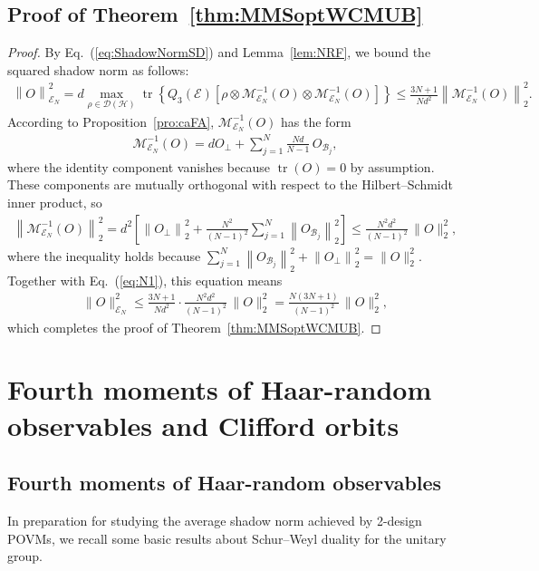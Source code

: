 \documentclass[aps,pra,twocolumn,nofootinbib,superscriptaddress,10pt]{revtex4-2}
\DeclareMathOperator{\tr}{tr}
\newcommand{\caB}{\mathcal{B}}
\newcommand{\caD}{\mathcal{D}}
\newcommand{\caE}{\mathcal{E}}
\newcommand{\caH}{\mathcal{H}}
\newcommand{\caM}{\mathcal{M}}
\newcommand{\eref}[1]{Eq.~\textup{(\ref{#1})}}
\newcommand{\lref}[1]{Lemma~\ref{#1}}
\newcommand{\pref}[1]{Proposition~\ref{#1}}
\newcommand{\thref}[1]{Theorem~\ref{#1}}
\begin{document}
\subsection{Proof of \thref{thm:MMSoptWCMUB}}
\begin{proof}
By \eref{eq:ShadowNormSD} and \lref{lem:NRF}, we bound the  squared shadow norm as follows:
\begin{align}
\left\|O\right\|_{\caE_N}^2=d\max_{\rho\in \caD(\caH)}\tr\left\{Q_3(\caE) \left[\rho \otimes \caM_{\caE_N}^{-1}(O)\otimes \caM_{\caE_N}^{-1}(O)\right]\right\}\le \frac{3N+1}{Nd^2}\left\|\caM_{\caE_N}^{-1}(O)\right\|_2^2. \label{eq:N1}
\end{align}
According to \pref{pro:caFA}, $\caM_{\caE_N}^{-1}(O)$ has the form
\begin{align}
\caM_{\caE_N}^{-1}(O) = dO_{\perp}+\sum_{j=1}^N\frac{Nd}{N-1}\,O_{\caB_j} ,
\end{align}
where the identity component vanishes because $\tr(O)=0$ by assumption. These components are mutually orthogonal with respect to the Hilbert--Schmidt inner product, so
\begin{align}
\left\|\caM_{\caE_N}^{-1}(O)\right\|_2^2 = d^2\left[\left\|O_{\perp}\right\|_2^2+\frac{N^2}{(N-1)^2}\sum_{j=1}^N\left\|O_{\caB_j}\right\|_2^2\right]\le \frac{N^2 d^2}{(N-1)^2}\,\|O\|_2^2, \label{eq:N2_expand}
\end{align}
where the inequality holds because $\sum_{j=1}^N\left\|O_{\caB_j}\right\|_2^2 + \left\|O_{\perp}\right\|_2^2 = \|O\|_2^2$. 
Together with \eref{eq:N1}, this equation means
\begin{align}
\|O\|_{\caE_N}^2 \le \frac{3N+1}{Nd^2} \cdot \frac{N^2 d^2}{(N-1)^2}\,\|O\|_2^2 = \frac{N(3N+1)}{(N-1)^2}\,\|O\|_2^2,
\end{align}
which completes the proof of \thref{thm:MMSoptWCMUB}.
\end{proof}



\section{Fourth moments of Haar-random observables and Clifford orbits}
\label{sup:schur}

\subsection{Fourth moments of Haar-random observables}
In preparation for studying the average shadow norm achieved by 2-design POVMs, we recall some basic results about Schur--Weyl duality for the unitary group.
\end{document}
